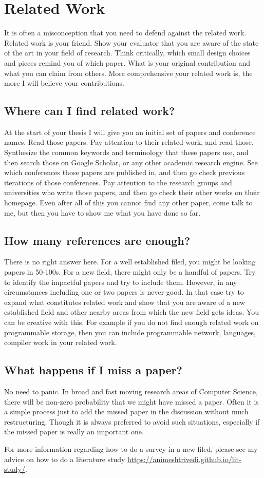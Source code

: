 \section{Related Work}
It is often a misconception that you need to defend against the related work. Related work is your friend. Show your evaluator that you are aware of the state of the art in your field of research. Think critically, which small design choices and pieces remind you of which paper. What is your original contribution and what you can claim from others. More comprehensive your related work is, the more I will believe your contributions. 

\subsection*{Where can I find related work?}
At the start of your thesis I will give you an initial set of papers and conference names. Read those papers. Pay attention to their related work, and read those. Synthesize the common keywords and terminology that these papers use, and then search those on Google Scholar, or any other academic research engine. See which conferences those papers are published in, and then go check previous iterations of those conferences. Pay attention to the research groups and universities who write those papers, and then go check their other works on their homepage. Even after all of this you cannot find any other paper, come talk to me, but then you have to show me what you have done so far. 

\subsection*{How many references are enough?}
There is no right answer here. For a well established filed, you might be looking papers in 50-100s. For a new field, there might only be a handful of papers. Try to identify the impactful papers and try to include them. However, in any circumstances including one or two papers is never good. In that case try to expand what constitutes related work and show that you are aware of a new established field and other nearby areas from which the new field gets ideas. You can be creative with this. For example if you do not find enough related work on programmable storage, then you can include programmable network, languages, compiler work in your related work. 


\subsection*{What happens if I miss a paper?}
No need to panic. In broad and fast moving research areas of Computer Science, there will be non-zero probability that we might have missed a paper. Often it is a simple process just to add the missed paper in the discussion without much restructuring. Though it is always preferred to avoid such situations, especially if the missed paper is really an important one. 

For more information regarding how to do a survey in a new filed, please see my advice on how to do a literature study \url{https://animeshtrivedi.github.io/lit-study/}. 
